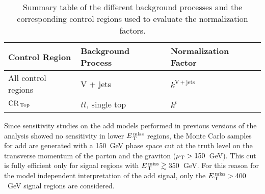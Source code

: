 \begin{table}[!h]
  \centering
  \begin{tabular}{lll}
    \toprule
    Control Region & Background Process & Normalization Factor \\
    \midrule \midrule
    All control regions & V + jets & $k^\mathrm{V + jets}$ \\
    $\mathrm{CR}_\mathrm{\, Top}$ & $t \bar{t}$, single top & $k^t$ \\
    \bottomrule
  \end{tabular}
  \caption{Summary table of the different background processes and the
    corresponding control regions used to evaluate the normalization factors.}
  \label{tab:norm_factors_2016}
\end{table}

Since sensitivity studies on the \gls{add} models performed in previous versions
of the analysis showed no sensitivity in lower $E_\mathrm{\, T}^\mathrm{\, miss}$ regions, the Monte Carlo
samples for \gls{add} are generated with a 150~GeV phase space cut at the truth
level on the transverse momentum of the parton and the graviton
($p_\mathrm{\, T} > 150$~GeV). This cut is fully efficient only for signal regions with
$E_\mathrm{\, T}^\mathrm{\, miss} \gtrsim 350$~GeV. For this reason for the model independent interpretation
of the \gls{add} signal, only the $E_\mathrm{\, T}^\mathrm{\, miss} > 400$~GeV signal regions are
considered.
